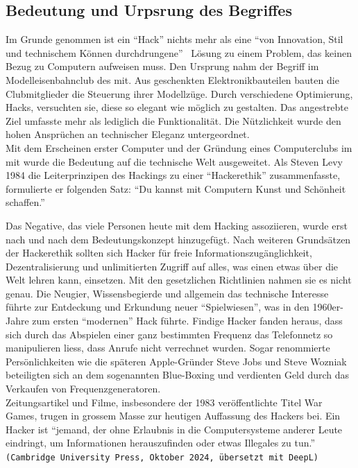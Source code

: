 \documentclass[11pt, a4paper]{article}
\begin{document}
\subsection{Bedeutung und Urpsrung des Begriffes}
Im Grunde genommen ist ein ``Hack'' nichts mehr als eine ``von Innovation, Stil und technischem Können durchdrungene''~\cite{bpbKleineGeschichte:online} Lösung zu einem Problem, das keinen Bezug zu Computern aufweisen muss. Den Ursprung nahm der Begriff im Modelleisenbahnclub des \gls{mit}. Aus geschenkten Elektronikbauteilen bauten die Clubmitglieder die Steuerung ihrer Modellzüge. Durch verschiedene Optimierung, Hacks, versuchten sie, diese so elegant wie möglich zu gestalten. Das angestrebte Ziel umfasste mehr als lediglich die Funktionalität. Die Nützlichkeit wurde den hohen Ansprüchen an technischer Eleganz untergeordnet. \\Mit dem Erscheinen erster Computer und der Gründung eines Computerclubs im \gls{mit} wurde die Bedeutung auf die technische Welt ausgeweitet. Als Steven Levy 1984 die Leiterprinzipen des Hackings zu einer ``Hackerethik'' zusammenfasste, formulierte er folgenden Satz: ``Du kannst mit Computern Kunst und Schönheit schaffen.'' \cite{bpbKleineGeschichte:online}

Das Negative, das viele Personen heute mit dem Hacking assoziieren, wurde erst nach und nach dem Bedeutungskonzept hinzugefügt. Nach weiteren Grundsätzen der Hackerethik sollten sich Hacker für freie Informationszugänglichkeit, Dezentralisierung und unlimitierten Zugriff auf alles, was einen etwas über die Welt lehren kann, einsetzen. Mit den gesetzlichen Richtlinien nahmen sie es nicht genau. Die Neugier, Wissensbegierde und allgemein das technische Interesse führte zur Entdeckung und Erkundung neuer ``Spielwiesen'', was in den 1960er-Jahre zum ersten ``modernen'' Hack führte. Findige Hacker fanden heraus, dass sich durch das Abspielen einer ganz bestimmten Frequenz das Telefonnetz so manipulieren liess, dass Anrufe nicht verrechnet wurden. Sogar renommierte Persönlichkeiten wie die späteren Apple-Gründer Steve Jobs und Steve Wozniak beteiligten sich an dem sogenannten Blue-Boxing und verdienten Geld durch das Verkaufen von Frequenzgeneratoren. \\Zeitungsartikel und Filme, insbesondere der 1983 veröffentlichte Titel War Games, trugen in grossem Masse zur heutigen Auffassung des Hackers bei.  Ein Hacker ist ``jemand, der ohne Erlaubnis in die Computersysteme anderer Leute eindringt, um Informationen herauszufinden oder etwas Illegales zu tun.'' \texttt{(Cambridge University Press, Oktober 2024, übersetzt mit DeepL)} \cite{bpbKleineGeschichte:online, CambridgeHacker:online}
\end{document}
